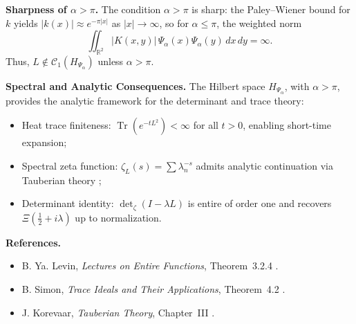 \begin{definition}
\medskip
\noindent\textbf{Sharpness of \(\alpha > \pi\).}
The condition \( \alpha > \pi \) is sharp: the Paley–Wiener bound for \( k \) yields \( |k(x)| \approx e^{-\pi|x|} \) as \( |x| \to \infty \), so for \( \alpha \le \pi \), the weighted norm
\[
\iint_{\mathbb{R}^2} |K(x,y)| \, \Psi_\alpha(x)\Psi_\alpha(y)\, dx\,dy = \infty.
\]
Thus, \( L \notin \mathcal{C}_1(H_{\Psi_\alpha}) \) unless \( \alpha > \pi \).

\medskip
\noindent\textbf{Spectral and Analytic Consequences.}
The Hilbert space \( H_{\Psi_\alpha} \), with \( \alpha > \pi \), provides the analytic framework for the determinant and trace theory:
\begin{itemize}
    \item Heat trace finiteness: \( \operatorname{Tr}(e^{-tL^2}) < \infty \) for all \( t > 0 \), enabling short-time expansion;
    \item Spectral zeta function: \( \zeta_L(s) = \sum \lambda_n^{-s} \) admits analytic continuation via Tauberian theory \cite{Korevaar2004Tauberian};
    \item Determinant identity: \( \det\nolimits_\zeta(I - \lambda L) \) is entire of order one and recovers \( \Xi(\tfrac{1}{2} + i\lambda) \) up to normalization.
\end{itemize}

\medskip
\noindent\textbf{References.}
\begin{itemize}
    \item B. Ya. Levin, \emph{Lectures on Entire Functions}, Theorem~3.2.4 \cite{Levin1996EntireLectures}.
    \item B. Simon, \emph{Trace Ideals and Their Applications}, Theorem~4.2 \cite{Simon2005TraceIdeals}.
    \item J. Korevaar, \emph{Tauberian Theory}, Chapter~III \cite{Korevaar2004Tauberian}.
\end{itemize}
\end{definition}
